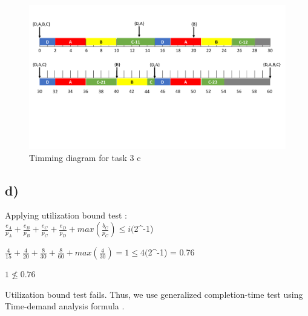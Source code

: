 \documentclass[10pt,a4paper]{article}
\begin{document}
\begin{figure}[!h]
\includegraphics[width=\linewidth]{3c.pdf}
\caption{Timming diagram for task 3 c}
\label{fig:3c}
\end{figure}

\subsection*{d)}
Applying utilization bound test \cite[~p74]{RTCLecture}:\\

$\frac{e_A}{p_A} + \frac{e_B}{p_B} + \frac{e_C}{p_C} + \frac{e_D}{p_D} + max(\frac{b_C}{p_C}) \leq i($2^-1)$ $  \newline

$\frac{4}{15} + \frac{4}{20} + \frac{8}{30} + \frac{8}{60} + max(\frac{4}{30}) = 1 \leq 4($2^-1) = 0.76$ $ \newline

$1 \nleq 0.76$ 
\newline

Utilization bound test fails. Thus, we use generalized completion-time test using Time-demand analysis formula \cite[~p74]{RTCLecture}.
\end{document}
